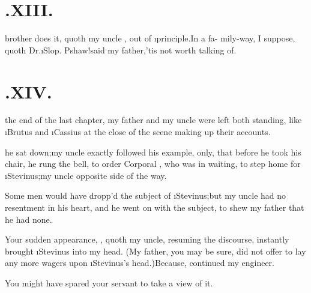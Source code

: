 \documentclass[twoside]{article}
\begin{document}
\section{\chapstrut{}.\enspace  XIII.}

 brother does it, quoth my uncle
\toby, out of \i{principle.}\tsh In a fa-\break
mily-way, I suppose, quoth Dr.\@ \i{Slop.}\tsh\break
Pshaw!\tsk said my father,\tsk ’tis not worth\break
talking of.

\section{\chapstrut{}.\enspace  XIV.}

 the end of the last chapter, my\break
father and my uncle \toby were\break
left both standing, like \i{Brutus} and \i{Cassius}\break
at the close of the scene making up their\break
accounts.

\break
\tsk he sat down;\tsk my uncle \toby
exactly followed his example, only, that before he took his chair, he rung the bell,
to order Corporal \trim, who was in waiting, to step home for
\i{Stevinus};\tsk my uncle 
opposite side of the way.

Some men would have dropp’d the subject of
\i{Stevinus};\tsk but my uncle \toby had no resentment
in his heart, and he went on with the subject, to shew my father
that he had none.

Your sudden appearance, \drslop,\break
quoth my uncle,
resuming the discourse, instantly brought \i{Stevinus} into my
head. (My father, you may be sure, did not offer to lay any more
wagers upon \i{Ste\-vinus}’s head.)\tsh Because, continued my
engineer.

You might have spared your servant
to take a view of it.
\end{document}
